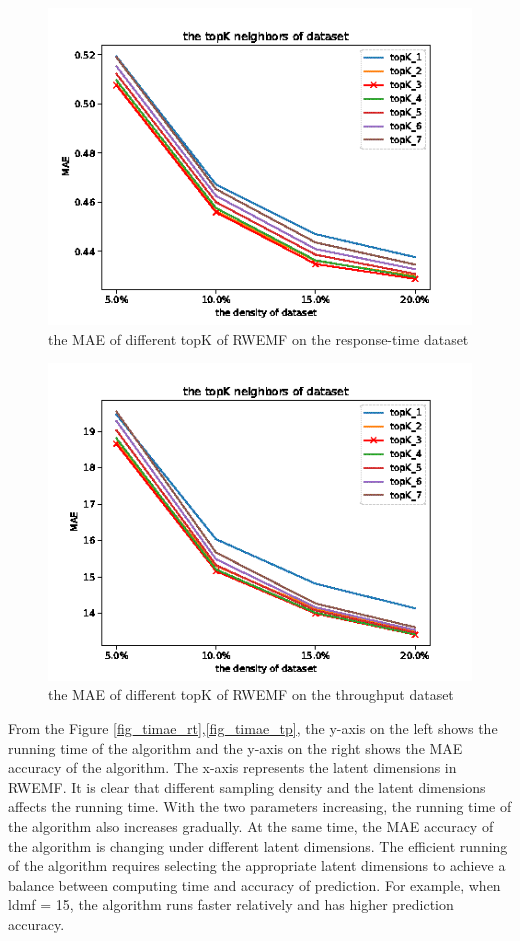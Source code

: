 \documentclass[conference]{IEEEtran}
\begin{document}
\begin{figure}[H]  
\centering  
\includegraphics[width=0.45\paperwidth]{topk_rt.png}  
\caption{the MAE of different topK of RWEMF on the response-time dataset }  
\label{fig_rt}  
\end{figure} 

\begin{figure}[H] 
\centering  
\includegraphics[width=0.45\paperwidth]{topk_tp.png}  
\caption{the MAE of different topK of RWEMF on the throughput dataset }
\label{fig_tp}  
\end{figure} 

\par From the Figure \ref{fig_timae_rt},\ref{fig_timae_tp}, the y-axis on the left shows the running time of the algorithm and the y-axis on the right shows the MAE accuracy of the algorithm. The x-axis represents the latent dimensions in RWEMF. It is clear that different sampling density and the latent dimensions affects the running time. With the two parameters increasing, the running time of the algorithm also increases gradually. At the same time, the MAE accuracy of the algorithm is changing under different latent dimensions. The efficient running of the algorithm requires selecting the appropriate latent dimensions to achieve a balance between computing time and accuracy of prediction. For example, when ldmf = 15, the algorithm runs faster relatively and has higher prediction accuracy.
\end{document}
